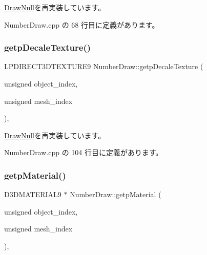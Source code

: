 \mbox{\hyperlink{class_draw_null_a7586cc78eed6bcaf2972ad7a6a70e665}{Draw\+Null}}を再実装しています。



 Number\+Draw.\+cpp の 68 行目に定義があります。

\mbox{\label{class_number_draw_a77d155c00ac4637154e62904556de05a}} 
\subsubsection{\texorpdfstring{getp\+Decale\+Texture()}{getpDecaleTexture()}}
{\footnotesize\ttfamily L\+P\+D\+I\+R\+E\+C\+T3\+D\+T\+E\+X\+T\+U\+R\+E9 Number\+Draw\+::getp\+Decale\+Texture (\begin{DoxyParamCaption}\item[{unsigned}]{object\+\_\+index,  }\item[{unsigned}]{mesh\+\_\+index }\end{DoxyParamCaption})\hspace{0.3cm}{\ttfamily [override]}, {\ttfamily [virtual]}}



\mbox{\hyperlink{class_draw_null_a2dfa2d2cbb66249f933420a38e9cadad}{Draw\+Null}}を再実装しています。



 Number\+Draw.\+cpp の 104 行目に定義があります。

\mbox{\label{class_number_draw_a4e1a672907ee288fc0c2c6caecdf3904}} 
\subsubsection{\texorpdfstring{getp\+Material()}{getpMaterial()}}
{\footnotesize\ttfamily D3\+D\+M\+A\+T\+E\+R\+I\+A\+L9 $\ast$ Number\+Draw\+::getp\+Material (\begin{DoxyParamCaption}\item[{unsigned}]{object\+\_\+index,  }\item[{unsigned}]{mesh\+\_\+index }\end{DoxyParamCaption})\hspace{0.3cm}{\ttfamily [override]}, {\ttfamily [virtual]}}



